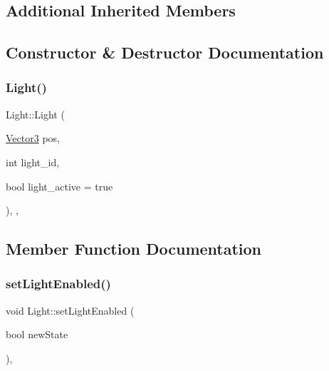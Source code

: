 \subsection*{Additional Inherited Members}


\subsection{Constructor \& Destructor Documentation}
\mbox{\label{class_light_a87c35098e794c0b8c929308145e0786e}} 
\subsubsection{\texorpdfstring{Light()}{Light()}}
{\footnotesize\ttfamily Light\+::\+Light (\begin{DoxyParamCaption}\item[{\hyperlink{class_vector3}{Vector3}}]{pos,  }\item[{int}]{light\+\_\+id,  }\item[{bool}]{light\+\_\+active = {\ttfamily true} }\end{DoxyParamCaption})\hspace{0.3cm}{\ttfamily [inline]}, {\ttfamily [explicit]}, {\ttfamily [protected]}}



\subsection{Member Function Documentation}
\mbox{\label{class_light_a0fbb865c0d4810c4521ecc92dfd69a0f}} 
\subsubsection{\texorpdfstring{set\+Light\+Enabled()}{setLightEnabled()}}
{\footnotesize\ttfamily void Light\+::set\+Light\+Enabled (\begin{DoxyParamCaption}\item[{bool}]{new\+State }\end{DoxyParamCaption})\hspace{0.3cm}{\ttfamily [inline]}, {\ttfamily [protected]}}

\mbox{\label{class_light_ae0b3607b306357b4b4540e8759ef3fbf}} 
